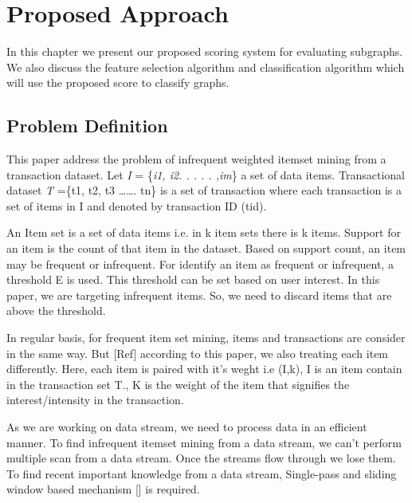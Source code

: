 \chapter{Proposed Approach} %
\label{Chapter 3}
In this chapter we present our proposed scoring system for evaluating subgraphs. We also discuss the feature selection algorithm and classification algorithm which will use the proposed score to classify graphs. 
%
%
%
\section{Problem Definition}
%
This paper address the problem of infrequent weighted itemset mining from a transaction dataset. Let {\it I} = \{{\it i1, i2. . . . . ,im}\} a set of data items. Transactional dataset {\it T} =\{t1, t2, t3 ……. tn\} is a set of transaction where each transaction is a set of items in I and denoted by transaction ID (tid). 

An Item set is a set of data items i.e. in k item sets there is k items.  Support for an item is the count of that item in the dataset. Based on support count, an item may be frequent or infrequent. For identify an item as frequent or infrequent, a threshold E is used. This threshold can be set based on user interest. In this paper, we are targeting infrequent items. So, we need to discard items that are above the threshold. 

In regular basis, for frequent item set mining, items and transactions are consider in the same way. But [Ref] according to this paper, we also treating each item differently. Here, each item is paired with it’s weght i.e (I,k), I is an item contain in the transaction set T., K is the weight of the item that signifies the interest/intensity in the transaction.

As we are working on data stream, we need to process data in an efficient manner. To find infrequent itemset mining from a data stream, we can’t perform multiple scan from a data stream. Once the streams flow  through we lose them. To find recent important knowledge from a data stream, Single-pass and sliding window based mechanism [] is required. 

